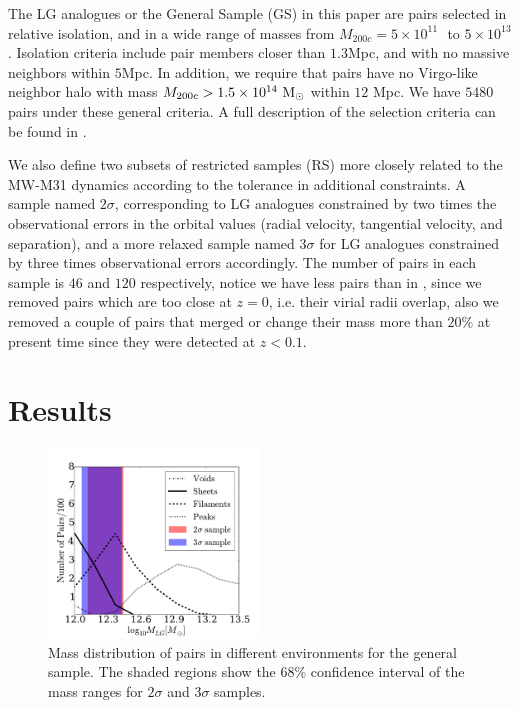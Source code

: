 \documentclass{emulateapj}
\newcommand{\mpc}{\rm{Mpc}}
\newcommand{\msun}{{\ifmmode{{\rm {M_{\odot}}}}\else{${\rm{M_{\odot}}}$}\fi}}
\begin{document}
The LG analogues or the General Sample (GS) in this paper are pairs selected in
relative isolation, and in a wide range of masses from  $M_{200c}=5
\times 10^{11}$ \msun $ $ to $ 5 \times 10^{13}$ \msun.  
Isolation criteria include pair members closer than $1.3$\mpc,
 and with no massive neighbors within $5$\mpc.
In addition, we require that pairs have no Virgo-like neighbor halo
with mass $M_{200c}>1.5 \times 10^{14}\ \rm M_{\odot}$ within $12$
Mpc.  
We have $5480$ pairs under these general criteria. 
A full description of the selection criteria can be found in
\citet{lganalogues,sat}.   

We also define two subsets of restricted samples (RS) more closely
related to the MW-M31  dynamics according to the tolerance in
additional constraints. 
A sample named $2\sigma$, corresponding to LG analogues constrained by
two times the observational errors in the orbital values (radial
velocity, tangential velocity, and separation), and a more relaxed
sample named $3\sigma$ for LG analogues constrained by three times
observational errors accordingly.  
The number of pairs in each sample is $46$ and $120$ respectively,
notice we have less pairs than in \citet{lganalogues}, since
we removed pairs which are too close at $z=0$, i.e. their virial radii
overlap, also we removed a couple of pairs that merged or change their
mass more than $20\%$ at present time since they were detected at
$z<0.1$. 

\section{Results}
\label{sec:results}


\begin{figure}
\begin{center}
  \includegraphics[width=0.50\textwidth]{fig1.pdf}
\caption{Mass distribution of pairs in different environments
for the general sample.
The shaded regions show the $68\%$ confidence interval of the mass ranges for $2\sigma$ and $3\sigma$
samples.  
\label{fig:median_fraction}}
\end{center}
\end{figure}
\end{document}
